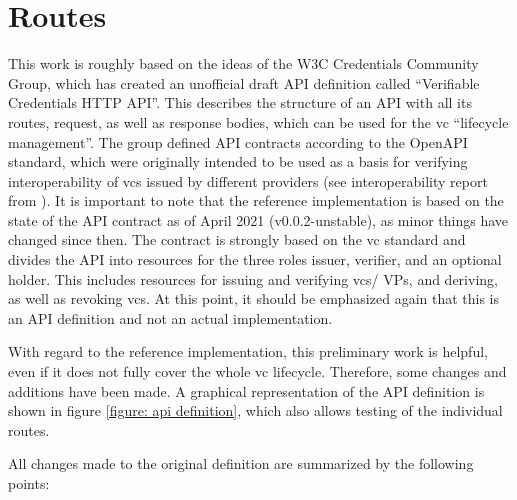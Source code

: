     \section{Routes}
    
    This work is roughly based on the ideas of the \ac{W3C} Credentials Community Group, which has created an unofficial draft API definition called “Verifiable Credentials HTTP API”. This describes the structure of an API with all its routes, request, as well as response bodies, which can be used for the \ac{vc} “lifecycle management”. The group defined API contracts according to the OpenAPI standard, which were originally intended to be used as a basis for verifying interoperability of \acp{vc} issued by different providers (see interoperability report from \cite{homeland_security_preventing_2020}). It is important to note that the reference implementation is based on the state of the API contract as of April 2021 (v0.0.2-unstable), as minor things have changed since then. The contract is strongly based on the \ac{vc} standard and divides the API into resources for the three roles issuer, verifier, and an optional holder. This includes resources for issuing and verifying \acp{vc}/ \acp{VP}, and deriving, as well as revoking \acp{vc}. At this point, it should be emphasized again that this is an API definition and not an actual implementation. \cite{world_wide_web_consortium_credentials_community_group_vc_2021, world_wide_web_consortium_credentials_community_group_verifiable_2021}
    
    With regard to the reference implementation, this preliminary work is helpful, even if it does not fully cover the whole \ac{vc} lifecycle. Therefore, some changes and additions have been made. A graphical representation of the API definition is shown in figure \ref{figure: api definition}, which also allows testing of the individual routes.
    
    All changes made to the original definition are summarized by the following points:
    
